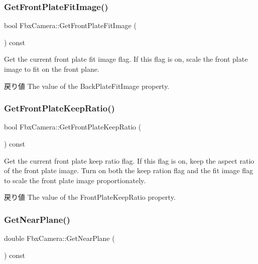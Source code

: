 \subsubsection{\texorpdfstring{Get\+Front\+Plate\+Fit\+Image()}{GetFrontPlateFitImage()}}
{\footnotesize\ttfamily bool Fbx\+Camera\+::\+Get\+Front\+Plate\+Fit\+Image (\begin{DoxyParamCaption}{ }\end{DoxyParamCaption}) const}

Get the current front plate fit image flag. If this flag is on, scale the front plate image to fit on the front plane. \begin{DoxyReturn}{戻り値}
The value of the Back\+Plate\+Fit\+Image property. 
\end{DoxyReturn}
\mbox{\label{class_fbx_camera_a35528b16d2cb6bfbc56883d08957003d}} 
\subsubsection{\texorpdfstring{Get\+Front\+Plate\+Keep\+Ratio()}{GetFrontPlateKeepRatio()}}
{\footnotesize\ttfamily bool Fbx\+Camera\+::\+Get\+Front\+Plate\+Keep\+Ratio (\begin{DoxyParamCaption}{ }\end{DoxyParamCaption}) const}

Get the current front plate keep ratio flag. If this flag is on, keep the aspect ratio of the front plate image. Turn on both the keep ration flag and the fit image flag to scale the front plate image proportionately. \begin{DoxyReturn}{戻り値}
The value of the Front\+Plate\+Keep\+Ratio property. 
\end{DoxyReturn}
\mbox{\label{class_fbx_camera_ae4c1364cd162c51ad539cf3f6fc1fbe6}} 
\subsubsection{\texorpdfstring{Get\+Near\+Plane()}{GetNearPlane()}}
{\footnotesize\ttfamily double Fbx\+Camera\+::\+Get\+Near\+Plane (\begin{DoxyParamCaption}{ }\end{DoxyParamCaption}) const}

